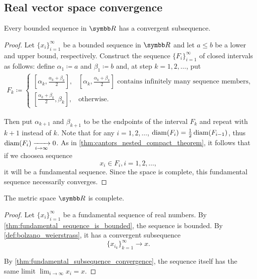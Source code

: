 \subsection{Real vector space convergence}\label{subsec:real_vector_space_convergence}

\begin{theorem}\label{def:bolzano_weierstrass}
  Every bounded sequence in \( \R \) has a convergent subsequence.
\end{theorem}
\begin{proof}
  Let \( \{ x_i \}_{i=1}^\infty \) be a bounded sequence in \( \R \) and let \( a \leq b \) be a lower and upper bound, respectively. Construct the sequence \( \{ F_i \}_{i=1}^\infty \) of closed intervals as follows: define \( \alpha_1 \coloneqq a \) and \( \beta_1 \coloneqq b \) and, at step \( k = 1, 2, \ldots \), put
  \begin{align*}
    F_k \coloneqq \begin{cases}
      [\alpha_k, \tfrac{\alpha_k+\beta_k} 2], &[\alpha_k, \tfrac{\alpha_k+\beta_k} 2]\text{ contains infinitely many sequence members}, \\
      [\tfrac{\alpha_k+\beta_k} 2, \beta_k], &\text{otherwise}.
    \end{cases}
  \end{align*}

  Then put \( \alpha_{k+1} \) and \( \beta_{k+1} \) to be the endpoints of the interval \( F_k \) and repeat with \( k+1 \) instead of \( k \). Note that for any \( i = 1, 2, \ldots \), \( \operatorname{diam}(F_i) = \tfrac 1 2 \operatorname{diam}(F_{i-1}) \), thus \( \operatorname{diam}(F_i) \xrightarrow[i \to \infty]{} 0 \). As in \cref{thm:cantors_nested_compact_theorem}, it follows that if we choose\AOC a sequence
  \begin{equation*}
    x_i \in F_i, i = 1, 2, \ldots,
  \end{equation*}
  it will be a fundamental sequence. Since the space is complete, this fundamental sequence necessarily converges.
\end{proof}

\begin{theorem}\label{def:real_numbers_complete_metric_space}
  The metric space \( \R \) is complete.
\end{theorem}
\begin{proof}
  Let \( \{ x_i \}_{i=1}^\infty \) be a fundamental sequence of real numbers. By \cref{thm:fundamental_sequence_is_bounded}, the sequence is bounded. By \cref{def:bolzano_weierstrass}, it has a convergent subsequence
  \begin{equation*}
    \{ x_{i_k} \}_{k=1}^\infty \to x.
  \end{equation*}

  By \cref{thm:fundamental_subsequence_convergence}, the sequence itself has the same limit \( \lim_{i \to \infty} x_i = x \).
\end{proof}
